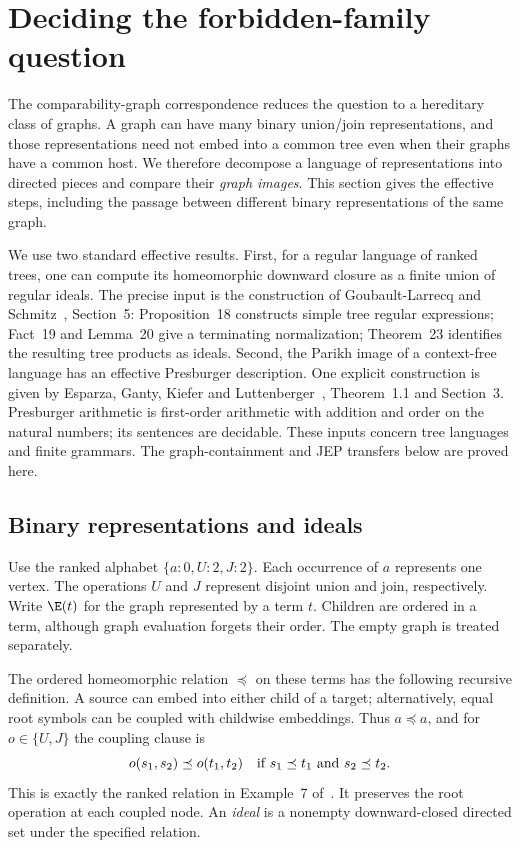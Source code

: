 \section{Deciding the forbidden-family question}

The comparability-graph correspondence reduces the question to a hereditary
class of graphs. A graph can have many binary union/join representations,
and those representations need not embed into a common tree even when their
graphs have a common host. We therefore decompose a language of representations
into directed pieces and compare their \emph{graph images}. This section
gives the effective steps, including the passage between different binary
representations of the same graph.

We use two standard effective results. First, for a regular language of
ranked trees, one can compute its homeomorphic downward closure as a finite
union of regular ideals. The precise input is the construction of
Goubault-Larrecq and Schmitz~\cite{GLS}, Section~5: Proposition~18 constructs
simple tree regular expressions; Fact~19 and Lemma~20 give a terminating
normalization; Theorem~23 identifies the resulting tree products as ideals.
Second, the Parikh image of a context-free language has an effective
Presburger description. One explicit construction is given by Esparza,
Ganty, Kiefer and Luttenberger~\cite{Parikh}, Theorem~1.1 and Section~3.
Presburger arithmetic is first-order arithmetic with addition and order on
the natural numbers; its sentences are decidable. These inputs concern tree
languages and finite grammars. The graph-containment and JEP transfers below
are proved here.

\subsection{Binary representations and ideals}
Use the ranked alphabet $\{a:0,U:2,J:2\}$. Each occurrence of $a$ represents
one vertex. The operations $U$ and $J$ represent disjoint union and join,
respectively. Write $\E(t)$ for the graph represented by a term $t$.
Children are ordered in a term, although graph evaluation forgets their
order. The empty graph is treated separately.

The ordered homeomorphic relation $\preceq$ on these terms has the following
recursive definition. A source can embed into either child of a target;
alternatively, equal root symbols can be coupled with childwise embeddings.
Thus $a\preceq a$, and for $o\in\{U,J\}$ the coupling clause is
\[
 o(s_1,s_2)\preceq o(t_1,t_2)
 \quad\hbox{if }s_1\preceq t_1\hbox{ and }s_2\preceq t_2.
\]
This is exactly the ranked relation in Example~7 of~\cite{GLS}.
It preserves the root operation at each coupled node. An \emph{ideal}
is a nonempty downward-closed directed set under the specified relation.


